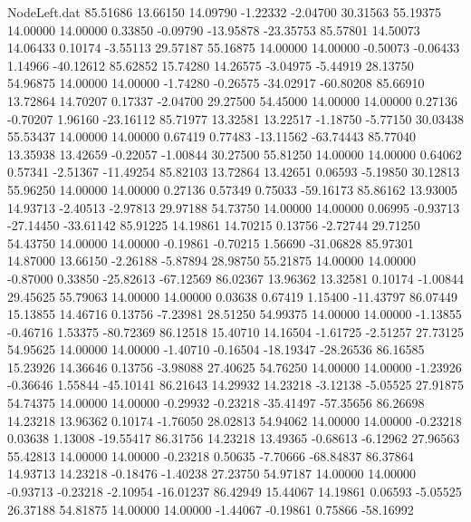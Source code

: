 \begin{filecontents}{NodeLeft.dat}
  85.51686   13.66150   14.09790    -1.22332   -2.04700   30.31563   55.19375   14.00000   14.00000    0.33850   -0.09790  -13.95878  -23.35753
  85.57801   14.50073   14.06433     0.10174   -3.55113   29.57187   55.16875   14.00000   14.00000   -0.50073   -0.06433    1.14966  -40.12612
  85.62852   15.74280   14.26575    -3.04975   -5.44919   28.13750   54.96875   14.00000   14.00000   -1.74280   -0.26575  -34.02917  -60.80208
  85.66910   13.72864   14.70207     0.17337   -2.04700   29.27500   54.45000   14.00000   14.00000    0.27136   -0.70207    1.96160  -23.16112
  85.71977   13.32581   13.22517    -1.18750   -5.77150   30.03438   55.53437   14.00000   14.00000    0.67419    0.77483  -13.11562  -63.74443
  85.77040   13.35938   13.42659    -0.22057   -1.00844   30.27500   55.81250   14.00000   14.00000    0.64062    0.57341   -2.51367  -11.49254
  85.82103   13.72864   13.42651     0.06593   -5.19850   30.12813   55.96250   14.00000   14.00000    0.27136    0.57349    0.75033  -59.16173
  85.86162   13.93005   14.93713    -2.40513   -2.97813   29.97188   54.73750   14.00000   14.00000    0.06995   -0.93713  -27.14450  -33.61142
  85.91225   14.19861   14.70215     0.13756   -2.72744   29.71250   54.43750   14.00000   14.00000   -0.19861   -0.70215    1.56690  -31.06828
  85.97301   14.87000   13.66150    -2.26188   -5.87894   28.98750   55.21875   14.00000   14.00000   -0.87000    0.33850  -25.82613  -67.12569
  86.02367   13.96362   13.32581     0.10174   -1.00844   29.45625   55.79063   14.00000   14.00000    0.03638    0.67419    1.15400  -11.43797
  86.07449   15.13855   14.46716     0.13756   -7.23981   28.51250   54.99375   14.00000   14.00000   -1.13855   -0.46716    1.53375  -80.72369
  86.12518   15.40710   14.16504    -1.61725   -2.51257   27.73125   54.95625   14.00000   14.00000   -1.40710   -0.16504  -18.19347  -28.26536
  86.16585   15.23926   14.36646     0.13756   -3.98088   27.40625   54.76250   14.00000   14.00000   -1.23926   -0.36646    1.55844  -45.10141
  86.21643   14.29932   14.23218    -3.12138   -5.05525   27.91875   54.74375   14.00000   14.00000   -0.29932   -0.23218  -35.41497  -57.35656
  86.26698   14.23218   13.96362     0.10174   -1.76050   28.02813   54.94062   14.00000   14.00000   -0.23218    0.03638    1.13008  -19.55417
  86.31756   14.23218   13.49365    -0.68613   -6.12962   27.96563   55.42813   14.00000   14.00000   -0.23218    0.50635   -7.70666  -68.84837
  86.37864   14.93713   14.23218    -0.18476   -1.40238   27.23750   54.97187   14.00000   14.00000   -0.93713   -0.23218   -2.10954  -16.01237
  86.42949   15.44067   14.19861     0.06593   -5.05525   26.37188   54.81875   14.00000   14.00000   -1.44067   -0.19861    0.75866  -58.16992

\end{filecontents}
